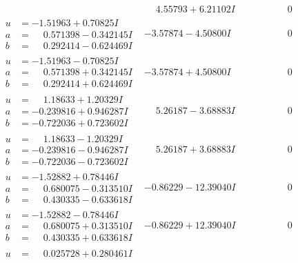 \documentclass[1p]{elsarticle_modified}
\theoremstyle{definition}
\begin{document}
$$\begin{array}{c|c|c}
 & \phantom{-}4.55793 + 6.21102 I & \phantom{-0.000000 } 0 \\ \hline\begin{aligned}
u &= -1.51963 + 0.70825 I \\
a &= \phantom{-}0.571398 - 0.342145 I \\
b &= \phantom{-}0.292414 - 0.624469 I\end{aligned}
 & -3.57874 - 4.50800 I & \phantom{-0.000000 } 0 \\ \hline\begin{aligned}
u &= -1.51963 - 0.70825 I \\
a &= \phantom{-}0.571398 + 0.342145 I \\
b &= \phantom{-}0.292414 + 0.624469 I\end{aligned}
 & -3.57874 + 4.50800 I & \phantom{-0.000000 } 0 \\ \hline\begin{aligned}
u &= \phantom{-}1.18633 + 1.20329 I \\
a &= -0.239816 + 0.946287 I \\
b &= -0.722036 + 0.723602 I\end{aligned}
 & \phantom{-}5.26187 - 3.68883 I & \phantom{-0.000000 } 0 \\ \hline\begin{aligned}
u &= \phantom{-}1.18633 - 1.20329 I \\
a &= -0.239816 - 0.946287 I \\
b &= -0.722036 - 0.723602 I\end{aligned}
 & \phantom{-}5.26187 + 3.68883 I & \phantom{-0.000000 } 0 \\ \hline\begin{aligned}
u &= -1.52882 + 0.78446 I \\
a &= \phantom{-}0.680075 - 0.313510 I \\
b &= \phantom{-}0.430335 - 0.633618 I\end{aligned}
 & -0.86229 - 12.39040 I & \phantom{-0.000000 } 0 \\ \hline\begin{aligned}
u &= -1.52882 - 0.78446 I \\
a &= \phantom{-}0.680075 + 0.313510 I \\
b &= \phantom{-}0.430335 + 0.633618 I\end{aligned}
 & -0.86229 + 12.39040 I & \phantom{-0.000000 } 0 \\ \hline\begin{aligned}
u &= \phantom{-}0.025728 + 0.280461 I \\

\end{aligned}
\end{array}$$
\end{document}
